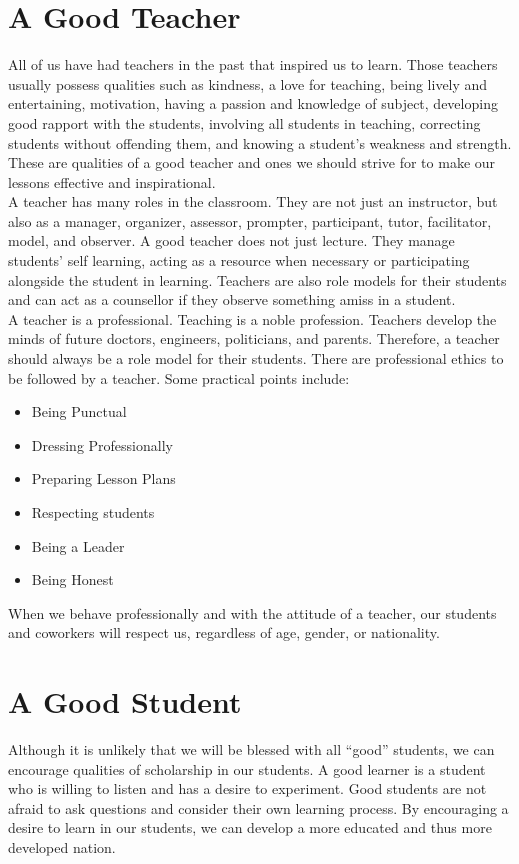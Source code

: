 \section{A Good Teacher}
All of us have had teachers in the past that inspired us to learn.  Those teachers usually possess qualities such as kindness, a love for teaching, being lively and entertaining, motivation, having a passion and knowledge of subject, developing good rapport with the students, involving all students in teaching, correcting students without offending them, and knowing a student's weakness and strength.  These are qualities of a good teacher and ones we should strive for to make our lessons effective and inspirational.\\

A teacher has many roles in the classroom.  They are not just an instructor, but also as a manager, organizer, assessor, prompter, participant, tutor, facilitator, model, and observer.  A good teacher does not just lecture.  They manage students’ self learning, acting as a resource when necessary or participating alongside the student in learning.  Teachers are also role models for their students and can act as a counsellor if they observe something amiss in a student.\\

A teacher is a professional. Teaching is a noble profession.  Teachers develop the minds of future doctors, engineers, politicians, and parents.  Therefore, a teacher should always be a role model for their students. There are professional ethics to be followed by a teacher. Some practical points include:
\begin{itemize}
\item Being Punctual
\item Dressing Professionally
\item Preparing Lesson Plans
\item Respecting students 
\item Being a Leader
\item Being Honest
\end{itemize}

When we behave professionally and with the attitude of a teacher, our students and coworkers will respect us, regardless of age, gender, or nationality.  

\section{A Good Student}
Although it is unlikely that we will be blessed with all ``good'' students, we can encourage qualities of scholarship in our students.  A good learner is a student who is willing to listen and has a desire to experiment.  Good students are not afraid to ask questions and consider their own learning process.  By encouraging a desire to learn in our students, we can develop a more educated and thus more developed nation. \\

